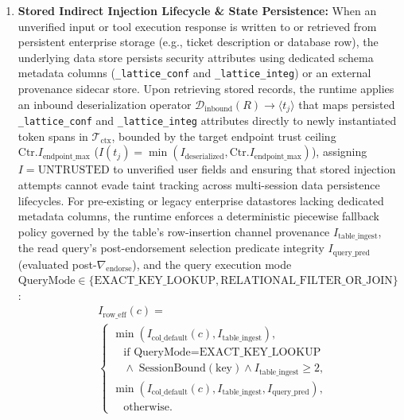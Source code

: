 \documentclass[conference,10pt]{IEEEtran}
\begin{document}
\begin{enumerate}
causal ancestry is disjoint from the saturated connector proceed unaffected.
    \item \textbf{Stored Indirect Injection Lifecycle \& State Persistence:} When an unverified input or tool execution response is written to or retrieved from persistent enterprise storage (e.g., ticket description or database row), the underlying data store persists security attributes using dedicated schema metadata columns (\texttt{\_lattice\_conf} and \texttt{\_lattice\_integ}) or an external provenance sidecar store. Upon retrieving stored records, the runtime applies an inbound deserialization operator $\mathcal{D}_{\text{inbound}}(R) \to \langle t_j \rangle$ that maps persisted \texttt{\_lattice\_conf} and \texttt{\_lattice\_integ} attributes directly to newly instantiated token spans in $\mathcal{T}_{\text{ctx}}$, bounded by the target endpoint trust ceiling $\text{Ctr}.I_{\text{endpoint\_max}}$ ($I(t_j) = \min(I_{\text{deserialized}}, \text{Ctr}.I_{\text{endpoint\_max}})$), assigning $I = \text{UNTRUSTED}$ to unverified user fields and ensuring that stored injection attempts cannot evade taint tracking across multi-session data persistence lifecycles. For pre-existing or legacy enterprise datastores lacking dedicated metadata columns, the runtime enforces a deterministic piecewise fallback policy governed by the table's row-insertion channel provenance $I_{\text{table\_ingest}}$, the read query's post-endorsement selection predicate integrity $I_{\text{query\_pred}}$ (evaluated post-$\nabla_{\text{endorse}}$), and the query execution mode $\text{QueryMode} \in \{\text{EXACT\_KEY\_LOOKUP}, \text{RELATIONAL\_FILTER\_OR\_JOIN}\}$:
    \[
    \begin{split}
    &I_{\text{row\_eff}}(c) = \\
    &\begin{cases}
    \min(I_{\text{col\_default}}(c), I_{\text{table\_ingest}}), \\
    \quad \text{if } \text{QueryMode} = \text{EXACT\_KEY\_LOOKUP} \\
    \quad \land \; \text{SessionBound}(\text{key}) \land I_{\text{table\_ingest}} \ge 2, \\[2pt]
    \min(I_{\text{col\_default}}(c), I_{\text{table\_ingest}}, I_{\text{query\_pred}}), \\
    \quad \text{otherwise.}
    \end{cases}
    \end{split}
    \]

\end{enumerate}
\end{document}
